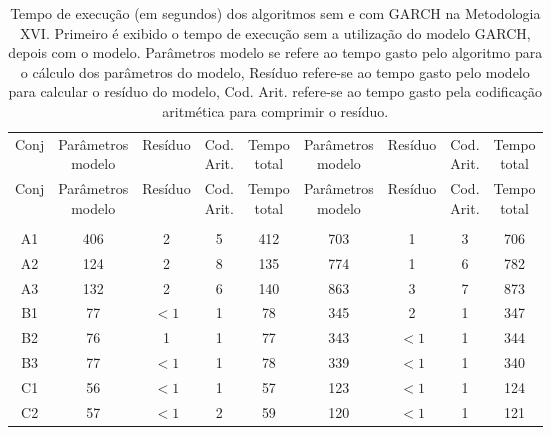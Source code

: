 \begin{center}
\begin{longtable}{ccccc|cccc}
\toprule
\rowcolor{white}
\caption[Metodologia XVI: tempo de execução]{Tempo de execução (em segundos)
dos algoritmos sem e com GARCH na Metodologia XVI. Primeiro é exibido o tempo de
execução sem a utilização do modelo GARCH, depois com o modelo. Parâmetros
modelo se refere ao tempo gasto pelo algoritmo para o cálculo dos parâmetros do
modelo, Resíduo refere-se ao tempo gasto pelo modelo para calcular o resíduo do
modelo, Cod. Arit. refere-se ao tempo gasto pela codificação aritmética para
comprimir o resíduo.} \label{tab:EvolucaoEntropiaMet16}\\
\midrule
Conj & \specialcell{Parâmetros\\modelo} &
Resíduo & \specialcell{Cod.\\Arit.} & \specialcell{Tempo\\total} &
\specialcell{Parâmetros\\modelo} &
Resíduo & \specialcell{Cod.\\Arit.} & \specialcell{Tempo\\total} \\
\midrule
\endfirsthead 
\midrule
\rowcolor{white}
Conj & \specialcell{Parâmetros\\modelo} &
Resíduo & \specialcell{Cod.\\Arit.} & \specialcell{Tempo\\total} &
\specialcell{Parâmetros\\modelo} &
Resíduo & \specialcell{Cod.\\Arit.} & \specialcell{Tempo\\total} \\
\toprule
\endhead
\midrule \\ %
\endfoot
\bottomrule 
\endlastfoot
A1&406&2&5&412&703&1&3&706\\
A2&124&2&8&135&774&1&6&782\\
A3&132&2&6&140&863&3&7&873\\
B1&77&$<1$&1&78&345&2&1&347\\
B2&76&1&1&77&343&$<1$&1&344\\
B3&77&$<1$&1&78&339&$<1$&1&340\\
C1&56&$<1$&1&57&123&$<1$&1&124\\
C2&57&$<1$&2&59&120&$<1$&1&121\\

\end{longtable}
\end{center}
